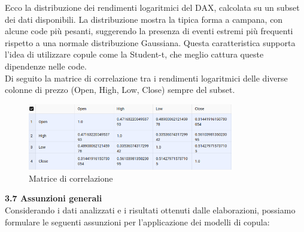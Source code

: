 \documentclass[a4paper,12pt]{article}
\begin{document}
\noindent Ecco la distribuzione dei rendimenti logaritmici del DAX, calcolata su un subset dei dati disponibili. La distribuzione mostra la tipica forma a campana, con alcune code più pesanti, suggerendo la presenza di eventi estremi più frequenti rispetto a una normale distribuzione Gaussiana. Questa caratteristica supporta l'idea di utilizzare copule come la Student-t, che meglio cattura queste dipendenze nelle code.\\
\newpage
\noindent Di seguito la matrice di correlazione tra i rendimenti logaritmici delle diverse colonne di prezzo (Open, High, Low, Close) sempre del subset.

\begin{figure}[h] %
	\centering %
	\includegraphics[width=0.8\textwidth]{corr.png} %
	\caption{Matrice di correlazione} %
	\label{fig:immagine} %
\end{figure}

\noindent\textbf{3.7 Assunzioni generali}\\

\noindent Considerando i dati analizzati e i risultati ottenuti dalle elaborazioni, possiamo formulare le seguenti assunzioni per l'applicazione dei modelli di copula:
\end{document}
